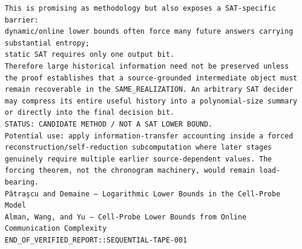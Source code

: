\documentclass[11pt]{article}
\begin{document}
\begin{Verbatim}[breaklines=true,breakanywhere=true]
This is promising as methodology but also exposes a SAT-specific barrier:
dynamic/online lower bounds often force many future answers carrying substantial entropy;
static SAT requires only one output bit.
Therefore large historical information need not be preserved unless the proof establishes that a source-grounded intermediate object must remain recoverable in the SAME_REALIZATION. An arbitrary SAT decider may compress its entire useful history into a polynomial-size summary or directly into the final decision bit.
STATUS: CANDIDATE METHOD / NOT A SAT LOWER BOUND.
Potential use: apply information-transfer accounting inside a forced reconstruction/self-reduction subcomputation where later stages genuinely require multiple earlier source-dependent values. The forcing theorem, not the chronogram machinery, would remain load-bearing.
Pătraşcu and Demaine — Logarithmic Lower Bounds in the Cell-Probe Model
Alman, Wang, and Yu — Cell-Probe Lower Bounds from Online Communication Complexity
END_OF_VERIFIED_REPORT::SEQUENTIAL-TAPE-001
\end{Verbatim}
\end{document}

